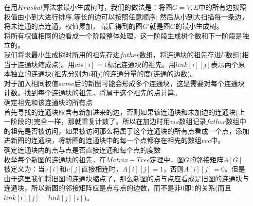 在用$Kruskal$算法求最小生成树时，我们的做法是：将图$G={V,E}$中的所有边按照权值由小到大进行排序,等长的边可以按照任意顺序; 然后从小到大扫描每一条边，将未连通的点连通，权值累加， 最后得到的图$G’$就是图$G$的最小生成树。\\
将所有权值相同的边看成一个阶段整体处理，这一阶段生成树个数和下一阶段是独立的。\\
我们将求最小生成树时所用的祖先存进$father$数组，将连通块的祖先存进$U$数组(相当于连通块缩成点)。用$vis[i]=1$标记连通块的祖先。用$link[i][j]$表示两个原本独立的连通块(祖先分别为$i和j$)的连通分量的度(连通的边数)。\\
对于加入相同权值$same$后的新图可能会形成多个连通块，这是需要对每个连通块计数。找到每个连通块的祖先，将属于这个祖先的点计算。\\

确定祖先和该连通块的所有点 \\
首先寻找的连通块应含有新加进来的边，否则如果该连通块和未加边的连通块(上一阶段的)完全一样，那就重复计数了。所以在加边时用$vis$数组记录$father$数组中的祖先是否被访问，如果被访问那么将属于这个连通块的所有点看成一个点，添加进新图的连通块，将新图的连通块中的每一个点都存在祖先的数组$vec$中。 \\

确定连通块内的点与点是否直接连通和每个点的度数 \\
枚举每个新图的连通块的祖先，在$Matrix-Tree定理$中，图$G$的邻接矩阵$A[G]$被定义为：当$v[i]和v[j]$直接相连时，$A[i][j]=1$，否则$A[i][j]=0$。但是由于这里我们将旧图的连通块缩点了，那么新图的点与点应看成是旧图的连通块与连通块，所以新图的邻接矩阵应是点与点的边数，而不是非$0$即$1$的关系(而且$link[i][j]=link[j][i]$)。 \\

